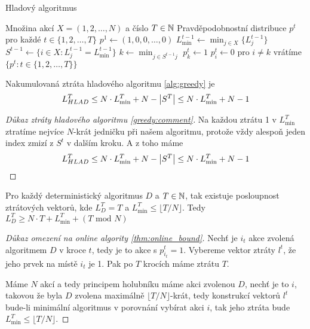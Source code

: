 \begin{algorithm}
    \algrenewcommand{}
    \algrenewcommand{}
    \caption{Hladový algoritmus}
    \label{alg:greedy}
    \begin{algorithmic}[1]
        \Require  Množina akcí $X =(1,2,\dots,N)$ a číslo $T \in \mathbb{N}$
        \Ensure Pravděpodobnostní distribuce $p^t$ pro každé $t \in \{1,2,\dots, T\}$
        \State $p^1 \leftarrow (1,0,0,\dots,0)$
        \State $L^{t-1}_{\min} \leftarrow \min_{j \in X} \{L^{t-1}_j\}$ 
        \State $S^{t-1} \leftarrow \{i\in X: L^{t-1}_j = L^{t-1}_{\min}\}$
        \State $k \leftarrow \min_{j \in S^{t-1} j}$
        \State $p_k^t \leftarrow 1$
        \State $p^t_i \leftarrow 0$ pro $i \neq k$
        \EndFor
        \State vrátíme $\{p^t: t\in \{1,2,\dots,T\}\}$
    \end{algorithmic}
\end{algorithm}

\begin{theorem}
\label{thm:greedy_comment}
Nakumulovaná ztráta hladového algoritmu \ref{alg:greedy} je
$$ 
L^T_{HLAD} \leq N \cdot L^T_{\min} + N - \left|S^T\right| \leq N \cdot L^T_{\min} + N - 1
$$
\end{theorem}
\begin{proof}[Důkaz ztráty hladového algoritmu \ref{greedy:comment}]
Na každou ztrátu 1 v $L^T_{\min}$ ztratíme nejvíce $N$-krát jedničku při našem algoritmu, protože vždy alespoň jeden index zmizí z $S^t$ v dalším kroku. 
A z toho máme 
$$ 
L^T_{HLAD} \leq N \cdot L^T_{\min} + N - \left|S^T\right| \leq N \cdot L^T_{\min} + N - 1
$$
\end{proof}
\begin{theorem}\label{thm:online_bound}
Pro každý deterministický algoritmus $D$ a $T\in \mathbb{N}$, tak existuje posloupnost ztrátových vektorů, kde $L^T_D = T$ a $L^T_{\min} \leq \lfloor T/N \rfloor$. 
Tedy $L_D^T \geq N \cdot T + L^T_{\min} + (T \text{ mod } N)$
\end{theorem}
\begin{proof}[Důkaz omezení na online algority \ref{thm:online_bound}]
    Nechť je $i_t$ akce zvolená algoritmem $D$ v kroce $t$, tedy je to akce s $p^t_{i_t} =1$. 
    Vybereme vektor ztráty $l^t$, že jeho prvek na místě $i_t$ je 1. 
    Pak po $T$ krocích máme ztrátu $T$. 

    Máme $N$ akcí a tedy principem holubníku máme akci zvolenou $D$, nechť je to $i$, takovou že byla $D$ zvolena maximálně $\lfloor T/N \rfloor$-krát, tedy konstrukcí vektorů $l^t$ bude-li minimální algoritmus v porovnání vybírat akci $i$, tak jeho ztráta bude $L^T_{\min} \leq \lfloor T/N \rfloor$.
\end{proof}

